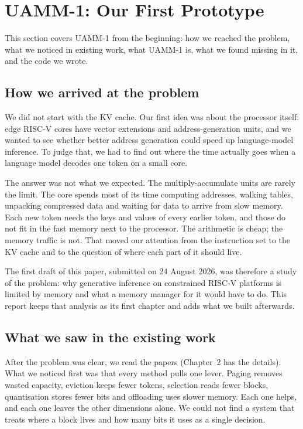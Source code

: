 \documentclass[12pt,a4paper]{report}
\begin{document}
\chapter{UAMM-1: Our First Prototype}
This section covers UAMM-1 from the beginning: how we reached the problem, what we noticed in existing work, what UAMM-1 is, what we found missing in it, and the code we wrote.

\section{How we arrived at the problem}
We did not start with the KV cache. Our first idea was about the processor itself: edge RISC-V cores have vector extensions and address-generation units, and we wanted to see whether better address generation could speed up language-model inference. To judge that, we had to find out where the time actually goes when a language model decodes one token on a small core.

The answer was not what we expected. The multiply-accumulate units are rarely the limit. The core spends most of its time computing addresses, walking tables, unpacking compressed data and waiting for data to arrive from slow memory. Each new token needs the keys and values of every earlier token, and those do not fit in the fast memory next to the processor. The arithmetic is cheap; the memory traffic is not. That moved our attention from the instruction set to the KV cache and to the question of where each part of it should live.

The first draft of this paper, submitted on 24 August 2026, was therefore a study of the problem: why generative inference on constrained RISC-V platforms is limited by memory and what a memory manager for it would have to do. This report keeps that analysis as its first chapter and adds what we built afterwards.

\section{What we saw in the existing work}
After the problem was clear, we read the papers (Chapter~2 has the details). What we noticed first was that every method pulls one lever. Paging removes wasted capacity, eviction keeps fewer tokens, selection reads fewer blocks, quantisation stores fewer bits and offloading uses slower memory. Each one helps, and each one leaves the other dimensions alone. We could not find a system that treats where a block lives and how many bits it uses as a single decision.
\end{document}
